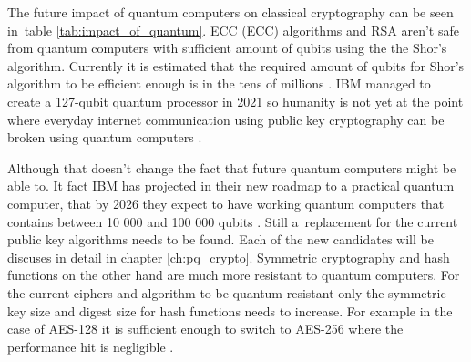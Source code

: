 The future impact of quantum computers on classical cryptography can be seen in~table \ref{tab:impact_of_quantum}. ECC (\acl{ECC}) algorithms and RSA aren't safe from quantum computers with sufficient amount of qubits using the the Shor's algorithm. Currently it is estimated that the required amount of qubits for Shor's algorithm to be efficient enough is in the tens of millions \cite{Bernstein149}\cite{Mosca2015}. IBM managed to create a 127-qubit quantum processor in 2021 so humanity is not yet at the point where everyday internet communication using public key cryptography can be broken using quantum computers \cite{0MBNdFRCTLK35MFY}.

Although that doesn't change the fact that future quantum computers might be able to. It fact IBM has projected in their new roadmap to a practical quantum computer, that by 2026 they expect to have working quantum computers that contains between 10 000 and 100 000 qubits \cite{Gambetta2021}. Still a~replacement for the current public key algorithms needs to be found. Each of the new candidates will be discuses in detail in chapter \ref{ch:pq_crypto}.
\newpage
Symmetric cryptography and hash functions on the other hand are much more resistant to quantum computers. For the current ciphers and algorithm to be quantum-resistant only the symmetric key size and digest size for hash functions needs to increase. For example in the case of AES-128 it is sufficient enough to switch to AES-256 where the performance hit is negligible \cite{Bernstein149}.

